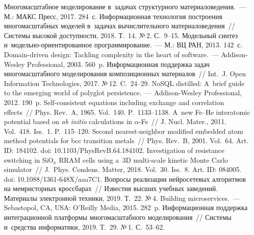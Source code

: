 \begin{multicols}{2}
{{\begin{thebibliography}{99}
  Многомасштабное моделирование в~задачах структурного 
материаловедения.~--- М.: МАКС Пресс, 2017. 284~с.
  Информационная технология по\-стро\-ения многомасштабных моделей 
в~задачах вычислительного материаловедения~// Системы высокой доступности, 
2018. Т.~14.  №\,2. С.~9--15.
  Модельный синтез и~модельно-ори\-ен\-ти\-ро\-ван\-ное 
 программирование.~--- М.: ВЦ РАН, 2013. 142~с.
  Domain-driven design: Tackling complexity in the heart of software.~--- 
 Addison-Wesley Professional, 2003. 560~p.
  Информационная поддержка задач 
многомасштабного моделирования композиционных материалов~// Int.~J. Open Information 
Technologies, 2017. №\,12. C.~24--29.
  NoSQL distilled: 
 A~brief guide to the emerging world of polyglot 
persistence.~--- Addison-Wesley Professional, 2012. 190~p.
  Self-consistent equations including exchange and correlation effects~// 
Phys. Rev.~A, 1965. Vol.~140. P.~1133--1138.     
  A~new Fe--He interatomic potential based on 
\textit{ab initio} calculations in $\alpha$-Fe~// J. Nucl. Mater., 2011. Vol.~418. Iss.~1. P.~115--120. 
  Second nearest-neighbor modified embedded 
atom method potentials for bcc transition metals~// Phys. Rev.~B, 2001. Vol.~64. Art. ID: 184102. 
doi: 10.1103/PhysRevB.64.184102.
  Investigation of 
resistance switching in SiO$_x$ RRAM cells using a~3D multi-scale kinetic Monte Carlo simulator~// 
J.~Phys. Condens. Matter, 2018. Vol.~30. Iss.~8. Art. ID: 084005. doi: 
10.1088/1361-648X/aaa7C1.
  Вопросы реализации нейросетевых 
алгоритмов на мемристорных кроссбарах~// Известия высших учебных заведений. Материалы 
электронной техники, 2019. Т.~22. №\,4. %
  Building microservices.~--- Sebastopol, CA, USA: O'Reilly Media, 2015. 282~p.
  Информационная поддержка интеграционной платформы 
многомасштабного моделирования~// Системы и~средства информатики, 2019. Т.~29. №\,1. 
С.~53--62.
\end{thebibliography}

 }
 }

\end{multicols}


